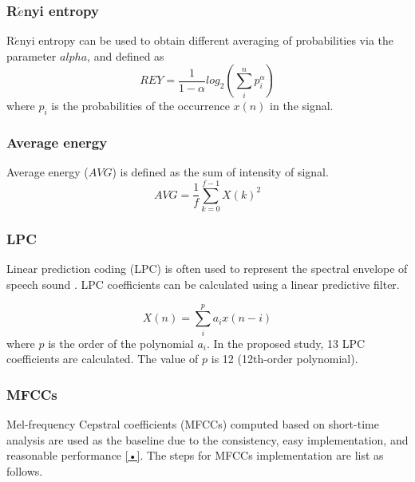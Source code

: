 \subsubsection{R$\acute{e}$nyi entropy}

R$\acute{e}$nyi entropy can be used to obtain different averaging of probabilities via the parameter $alpha$, and defined as
\begin{equation}
REY=\frac{1}{1-\alpha}log_{2}(\sum_{i}^{n}p_{i}^{\alpha})
\end{equation}
where $p_{i}$ is the probabilities of the occurrence $x(n)$ in the signal.


\subsubsection{Average energy}
Average energy ($AVG$) is defined as the sum of intensity of signal.
\begin{equation}
AVG = \frac{1}{f}\sum_{k=0}^{f-1}X(k)^{2}
\end{equation}


\subsubsection{LPC}
Linear prediction coding (LPC) is often used to represent the spectral envelope of speech sound \citep{itakura1975line}. LPC coefficients can be calculated using a linear predictive filter.

\begin{equation}
X(n) = \sum_{i}^{p}a_{i}x(n-i)
\end{equation}
where $p$ is the order of the polynomial $a_{i}$. In the proposed study, 13 LPC coefficients are calculated. The value of $p$ is 12 (12th-order polynomial).

\subsubsection{MFCCs}

Mel-frequency Cepstral coefficients (MFCCs) computed based on short-time analysis are used as the baseline due to the consistency, easy implementation, and reasonable performance \ref{•}. The steps for MFCCs implementation are list as follows.

